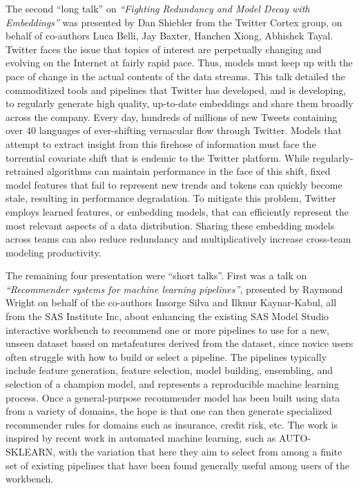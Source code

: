 \documentclass[11pt]{article}
\begin{document}
The second ``long talk'' on \emph{``Fighting Redundancy and Model Decay with Embeddings''} was presented by Dan Shiebler from the Twitter Cortex group, on behalf of co-authors Luca Belli, Jay Baxter, Hanchen Xiong, Abhishek Tayal. Twitter faces the issue that topics of interest are perpetually changing and evolving on the Internet at fairly rapid pace. Thus, models must keep up with the pace of change in the actual contents of the data streams. This talk detailed the commoditized tools and pipelines that Twitter has developed, and is developing, to regularly generate high quality, up-to-date embeddings and share them broadly across the company. Every day, hundreds of millions of new Tweets containing over 40 languages of ever-shifting vernacular flow through Twitter. Models that attempt to extract insight from this firehose of information must face the torrential covariate shift that is endemic to the Twitter platform. While regularly-retrained algorithms can maintain performance in the face of this shift, fixed model features that fail to represent new trends and tokens can quickly become stale, resulting in performance degradation. To mitigate this problem, Twitter employs learned features, or embedding models, that can efficiently represent the most relevant aspects of a data distribution. Sharing these embedding models across teams can also reduce redundancy and multiplicatively increase cross-team modeling productivity. 


The remaining four presentation were ``short talks''. First was a talk on \emph{``Recommender systems for machine learning pipelines''}, presented by Raymond Wright on behalf of the co-authors Insorge Silva and Ilknur Kaynar-Kabul, all from the SAS Institute Inc, about enhancing the existing SAS Model Studio interactive workbench to recommend one or more pipelines to use for a new, unseen dataset based on metafeatures derived from the dataset, since novice users often struggle with how to build or select a pipeline. The pipelines typically include feature generation, feature selection, model building, ensembling, and selection of a champion model, and represents a reproducible machine learning process. Once a general-purpose recommender model has been built using data from a variety of domains, the hope is that one can then generate specialized recommender rules for domains such as insurance, credit risk, etc. The work is inspired by recent work in automated machine learning, such as AUTO-SKLEARN, with the variation that here they aim to select from among a finite set of existing pipelines that have been found generally useful among users of the workbench.
\end{document}
